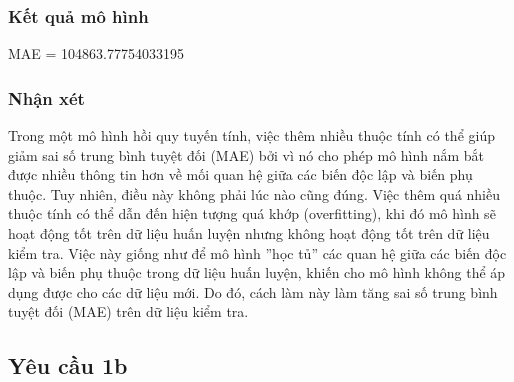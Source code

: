 \documentclass[]{article}
\begin{document}
\subsubsection{Kết quả mô hình}
MAE = 104863.77754033195

\subsubsection{Nhận xét}
Trong một mô hình hồi quy tuyến tính, việc thêm nhiều thuộc tính có thể giúp giảm sai số trung bình tuyệt đối (MAE) bởi vì nó cho phép mô hình nắm bắt được nhiều thông tin hơn về mối quan hệ giữa các biến độc lập và biến phụ thuộc. Tuy nhiên, điều này không phải lúc nào cũng đúng. Việc thêm quá nhiều thuộc tính có thể dẫn đến hiện tượng quá khớp (overfitting), khi đó mô hình sẽ hoạt động tốt trên dữ liệu huấn luyện nhưng không hoạt động tốt trên dữ liệu kiểm tra. Việc này giống như để mô hình ''học tủ'' các quan hệ giữa các biến độc lập và biến phụ thuộc trong dữ liệu huấn luyện, khiến cho mô hình không thể áp dụng được cho các dữ liệu mới. Do đó, cách làm này làm tăng sai số trung bình tuyệt đối (MAE) trên dữ liệu kiểm tra.

\subsection{Yêu cầu 1b}
\end{document}
